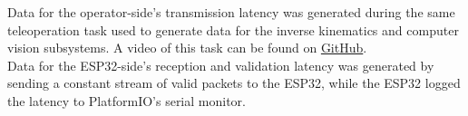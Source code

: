 Data for the operator-side's transmission latency was generated during the same teleoperation task used to generate data for the inverse kinematics and computer vision subsystems. A video of this task can be found on \href{https://github.com/Neo-Vorsatz-UCT/eee4022s/blob/main/data/EEE4022S_TDR-04_Demo.mp4}{GitHub}.\\
Data for the ESP32-side's reception and validation latency was generated by sending a constant stream of valid packets to the ESP32, while the ESP32 logged the latency to PlatformIO's serial monitor.
